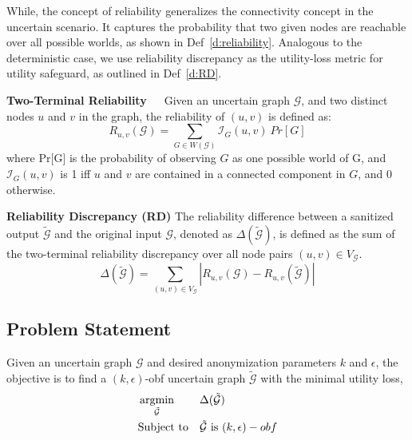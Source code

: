 While, the concept of reliability generalizes the connectivity concept in the uncertain scenario. 
It captures the probability that two given nodes are reachable over all possible worlds, as shown in Def~\ref{d:reliability}. 
Analogous to the deterministic case, we use reliability discrepancy as the utility-loss metric for utility safeguard, as outlined in Def~\ref{d:RD}. 
\begin{definition}
    \textbf{Two-Terminal Reliability~\cite{Colbourn_Colbourn_1987}}~~Given an uncertain graph $\mathcal{G}$, and two distinct nodes $u$ and $v$ in the graph, the reliability of $(u,v)$ is defined as:
        \begin{equation*}
                R_{u,v}(\mathcal{G})= \sum_{G \in W(\mathcal{G})} \mathcal{I}_{G}(u,v) ~ Pr[G] 
        \end{equation*}
    where Pr[G] is the probability of observing $G$ as one possible world of G, and $\mathcal{I}_{G}(u,v)$ is 1 iff $u$ and $v$ are contained in a connected component in $G$, and 0 otherwise.   
    \label{d:reliability}
\end{definition}

\theoremstyle{definition}
\begin{definition}
    \textbf{Reliability Discrepancy (RD)}
    The reliability difference between a sanitized output $\tilde{\mathcal{G}}$ and the original input $\mathcal{G}$, 
    denoted as $\Delta(\tilde{\mathcal{G}})$, 
    is defined as the sum of the two-terminal reliability discrepancy over all node pairs $(u,v) \in V_\mathcal{G}$.
    \begin{equation*}
        \Delta(\tilde{\mathcal{G}})=\sum_{(u,v) \in V_\mathcal{G} }|R_{u,v}(\mathcal{G})-R_{u,v}(\tilde{\mathcal{G}})|
    \end{equation*}
    \label{d:RD}
\end{definition}

\subsection{Problem Statement} 
\begin{problem}
     Given an uncertain graph $\mathcal{G}$ and desired anonymization parameters $k$ and $\epsilon$, 
     the objective is to find a  $(k,\epsilon)$-obf uncertain graph $\tilde{\mathcal{G}}$
     with the minimal utility loss,
     \begin{equation*}
             \begin{aligned}
                 & \argmin_{\tilde{
                \mathcal{G}}} & & \Delta(\tilde{\mathcal{G}}) \\
                &  \text{Subject to} & &\tilde{\mathcal{G}} \text{~is~} (k,\epsilon)-obf
            \end{aligned}
     \end{equation*}
     \label{prob:unobf}
\end{problem}
